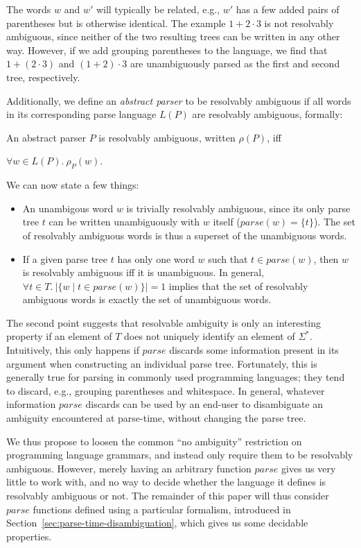 \documentclass[runningheads]{llncs}
\newcommand{\T}{\Sigma} %
\newcommand{\parse}{\mathit{parse}} %
\begin{document}
The words $w$ and $w'$ will typically be related, e.g., $w'$ has a few added pairs of parentheses but is otherwise identical.
The example $1 + 2 \cdot 3$
is not resolvably ambiguous, since neither of the two resulting trees can be written in any other way. However, if we add grouping parentheses to the language, we find that $1 + (2 \cdot 3)$ and $(1 + 2) \cdot 3$ are unambiguously parsed as the first and second tree, respectively.

Additionally, we define an \emph{abstract parser} to be resolvably ambiguous if all words in its corresponding parse language $L(P)$ are resolvably ambiguous, formally:

\begin{definition}\label{def:resolvable-language}
  An abstract parser $P$ is resolvably ambiguous, written $\rho(P)$, iff

  $\forall w \in L(P).\ \rho_P(w)$.
\end{definition}

\noindent We can now state a few things:

\begin{itemize}
\item An unambigous word $w$ is trivially resolvably ambiguous, since its only parse tree $t$ can be written unambiguously with $w$ itself ($\parse(w) = \{t\}$). The set of resolvably ambiguous words is thus a superset of the unambiguous words.
\item If a given parse tree $t$ has only one word $w$ such that $t \in \parse(w)$, then $w$ is resolvably ambiguous iff it is unambiguous. In general, $\forall t \in T.\ \lvert\{w \mid t \in \parse(w)\}\rvert = 1$ implies that the set of resolvably ambiguous words is exactly the set of unambiguous words.
\end{itemize}

\noindent The second point suggests that resolvable ambiguity is only an interesting property if an element of $T$ does not uniquely identify an element of $\T^{*}$. Intuitively, this only happens if $\parse$ discards some information present in its argument when constructing an individual parse tree. Fortunately, this is generally true for parsing in commonly used programming languages; they tend to discard, e.g., grouping parentheses and whitespace. In general, whatever information $\parse$ discards can be used by an end-user to disambiguate an ambiguity encountered at parse-time, without changing the parse tree.

We thus propose to loosen the common ``no ambiguity'' restriction on programming language grammars, and instead only require them to be resolvably ambiguous. However, merely having an arbitrary function $\parse$ gives us very little to work with, and no way to decide whether the language it defines is resolvably ambiguous or not. The remainder of this paper will thus consider $\parse$ functions defined using a particular formalism, introduced in Section~\ref{sec:parse-time-disambiguation}, which gives us some decidable properties.
\end{document}
